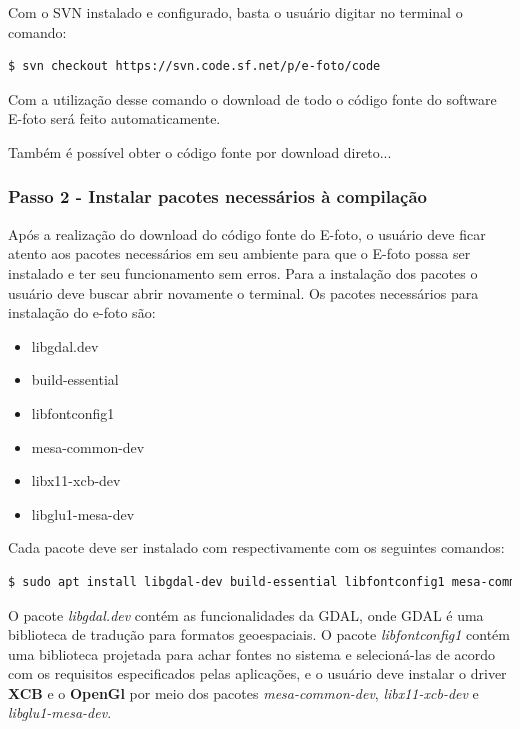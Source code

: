 Com o SVN instalado e configurado, basta o usuário digitar no terminal o comando:
\begin{lstlisting}[language=bash]
 $ svn checkout https://svn.code.sf.net/p/e-foto/code
\end{lstlisting}

Com a utilização desse comando o download de todo o código fonte do software E-foto será feito automaticamente. 

Também é possível obter o código fonte por download direto... %
    
\subsubsection{Passo 2 - Instalar pacotes necessários à compilação}  
Após a realização do download do código fonte do E-foto, o usuário deve ficar atento aos pacotes necessários em seu ambiente para que o E-foto possa ser instalado e ter seu funcionamento sem erros. Para a instalação dos pacotes o usuário deve buscar abrir novamente o terminal. Os pacotes necessários para instalação do e-foto são: 
\begin{itemize}
   	\item libgdal.dev
   	\item build-essential
   	\item libfontconfig1
   	\item mesa-common-dev
   	\item libx11-xcb-dev
   	\item libglu1-mesa-dev
\end{itemize}
Cada pacote deve ser instalado com respectivamente com os seguintes comandos: %
\begin{lstlisting}[language=bash]
	$ sudo apt install libgdal-dev build-essential libfontconfig1 mesa-common-dev libx11-xcb-dev libglu1-mesa-dev
\end{lstlisting}				
	
O pacote \textit{libgdal.dev} contém as funcionalidades da GDAL, onde GDAL é uma biblioteca de tradução para formatos geoespaciais.%
 O pacote \textit{libfontconfig1} contém uma biblioteca projetada para achar fontes no sistema e selecioná-las de acordo com os requisitos especificados pelas aplicações, e o usuário deve instalar o driver \textbf{XCB} e o \textbf{OpenGl} por meio dos pacotes \textit{mesa-common-dev}, \textit{libx11-xcb-dev} e \textit{libglu1-mesa-dev}. %
    
